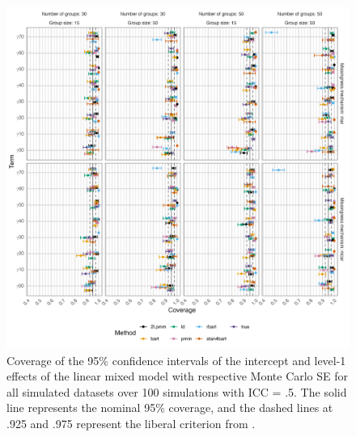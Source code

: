 \documentclass[preprint,12pt]{elsarticle}
\begin{document}
\begin{figure}[H]
    \centering
    \includegraphics[width=1\textwidth]{coveragelevel1.png}
    \caption{Coverage of the 95\% confidence intervals of the intercept and level-1 effects of the linear mixed model with respective Monte Carlo SE for all simulated datasets over 100 simulations with ICC = .5. The solid line represents the nominal 95\% coverage, and the dashed lines at .925 and .975 represent the liberal criterion from \citet{bradley1978}.}
    \label{fig:coveragelevel1}
\end{figure}
\end{document}
